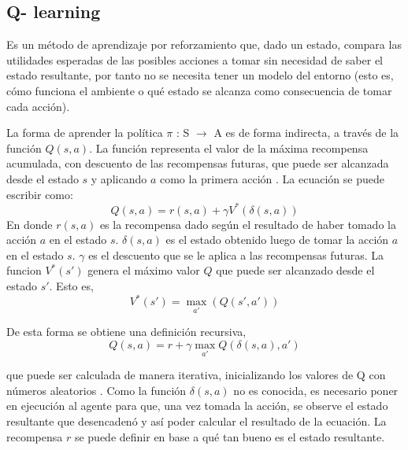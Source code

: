 \subsection{Q- learning}\label{subsec:Qlearning}

Es un método de aprendizaje por reforzamiento que, dado un estado, compara las utilidades esperadas de las posibles acciones a tomar sin necesidad de saber el estado resultante, por tanto no se necesita tener un modelo del entorno \cite{peterNorvig} (esto es, cómo funciona el ambiente o qu\'e estado se alcanza como consecuencia de tomar cada acción).

La forma de aprender la política $\pi$ : S $\to$ A es de forma indirecta, a través de la función $Q(s,a)$. La función representa el valor de la máxima recompensa acumulada, con descuento de las recompensas futuras, que puede ser alcanzada desde el estado $s$ y aplicando $a$ como la primera acción \cite{Mitchell}. La ecuación se puede escribir como:
\[Q(s,a) = r(s,a) + \gamma V^*(\delta(s,a))\]
En donde $r(s,a)$ es la recompensa dado según el resultado de haber tomado la acción $a$ en el estado $s$. $\delta(s,a)$ es el estado obtenido luego de tomar la acción $a$ en el estado $s$. $\gamma$ es el descuento que se le aplica a las recompensas futuras. La funcion $V^*(s')$ genera el máximo valor $Q$ que puede ser alcanzado desde el estado $s'$. Esto es,
\[V^*(s')= \max_{a'} (Q(s',a'))\] 

De esta forma se obtiene una definición recursiva,
\[Q(s,a) = r + \gamma \max_{a'} Q(\delta(s,a),a')\]

\noindent
que puede ser calculada de manera iterativa, inicializando los valores de Q con números aleatorios \cite{Mitchell}. Como la función $\delta(s,a)$ no es conocida, es necesario poner en ejecución al agente para que, una vez tomada la acción, se observe el estado resultante que desencadenó y así poder calcular el resultado de la ecuación. La recompensa $r$ se puede definir en base  a qu\'e tan bueno es el estado resultante. 


